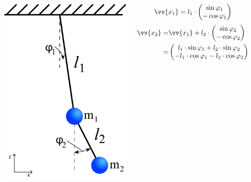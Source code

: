\begin{frame}
	\begin{columns}
	\includegraphics[width=\textwidth]{images/4/double-pendulum}
	\begin{block}{}
		\begin{equation}
			\vv{x_1}= l_1\cdot\begin{pmatrix}
			\sin \varphi_1 \\ -\cos \varphi_1
			\end{pmatrix}
		\end{equation}
		\begin{align}
			\vv{x_2}=& \vv{x_1} + l_2 \cdot \begin{pmatrix}
			\sin \varphi_2 \\ -\cos \varphi_2
			\end{pmatrix}
			\\=& \begin{pmatrix}
			l_1 \cdot \sin \varphi_1 + l_2 \cdot \sin \varphi_2 \\ - l_1 \cdot \cos \varphi_1 - l_2 \cdot \cos \varphi_2 \nonumber
			\end{pmatrix}
		\end{align}
	\end{block}
	\end{columns}
\end{frame}

